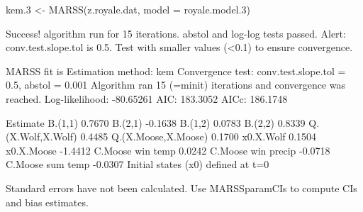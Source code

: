 \begin{Schunk}
\begin{Sinput}
 kem.3 <- MARSS(z.royale.dat, model = royale.model.3)
\end{Sinput}
\begin{Soutput}
Success! algorithm run for 15 iterations. abstol and log-log tests passed.
Alert: conv.test.slope.tol is 0.5.
Test with smaller values (<0.1) to ensure convergence.

MARSS fit is
Estimation method: kem 
Convergence test: conv.test.slope.tol = 0.5, abstol = 0.001
Algorithm ran 15 (=minit) iterations and convergence was reached. 
Log-likelihood: -80.65261 
AIC: 183.3052   AICc: 186.1748   
 
                    Estimate
B.(1,1)               0.7670
B.(2,1)              -0.1638
B.(1,2)               0.0783
B.(2,2)               0.8339
Q.(X.Wolf,X.Wolf)     0.4485
Q.(X.Moose,X.Moose)   0.1700
x0.X.Wolf             0.1504
x0.X.Moose           -1.4412
C.Moose win temp      0.0242
C.Moose win precip   -0.0718
C.Moose sum temp     -0.0307
Initial states (x0) defined at t=0

Standard errors have not been calculated. 
Use MARSSparamCIs to compute CIs and bias estimates.
\end{Soutput}
\end{Schunk}
